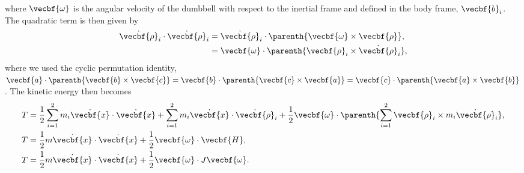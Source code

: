 \documentclass[11pt, reqno]{article}    %
\begin{document}
\begin{appendix}
where \( \vecbf{\omega} \) is the angular velocity of the dumbbell with respect to the inertial frame and defined in the body frame, \( \vecbf{b}_i\).
The quadratic term is then given by
\begin{align}
    \dot{\vecbf{\rho}}_i \cdot \dot{\vecbf{\rho}}_i &= \dot{\vecbf{\rho}}_i \cdot \parenth{\vecbf{\omega} \times \vecbf{\rho}} ,\nonumber \\
    &= \vecbf{\omega} \cdot \parenth{\vecbf{\rho}_i \times \dot{\vecbf{\rho}}_i } ,
\end{align}
where we used the cyclic permutation identity, \( \vecbf{a} \cdot \parenth{\vecbf{b} \times \vecbf{c}} = \vecbf{b} \cdot \parenth{\vecbf{c} \times \vecbf{a}}  = \vecbf{c} \cdot \parenth{\vecbf{a} \times \vecbf{b}}\).
The kinetic energy then becomes
\begin{align}\label{eq:kinetic_energy}
    T &= \frac{1}{2} \sum_{i=1}^2 m_i \dot{\vecbf{x}} \cdot \dot{\vecbf{x}}  + \sum_{i=1}^2 m_i \dot{\vecbf{x}} \cdot \dot{\vecbf{\rho}}_i + \frac{1}{2} \vecbf{\omega} \cdot \parenth{\sum_{i=1}^2 \vecbf{\rho}_i \times m_i \dot{\vecbf{\rho}}_i } , \nonumber\\
    T &= \frac{1}{2} m \dot{\vecbf{x}} \cdot \dot{\vecbf{x}} + \frac{1}{2} \vecbf{\omega}\cdot \vecbf{H} , \nonumber \\
    T &= \frac{1}{2} m \dot{\vecbf{x}} \cdot \dot{\vecbf{x}} + \frac{1}{2} \vecbf{\omega}\cdot J \vecbf{\omega} .
\end{align}
\end{appendix}

%

\end{document}
